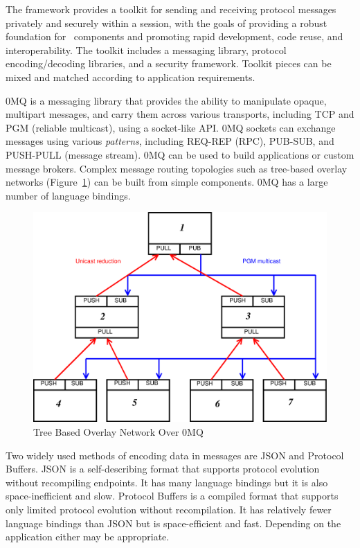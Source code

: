 The framework provides a toolkit for sending and receiving
protocol messages privately and securely within a session,
with the goals of providing a robust foundation for \ngrm\ components
and promoting rapid development, code reuse, and interoperability.
The toolkit includes a messaging library,
protocol encoding/decoding libraries, and a security framework.
Toolkit pieces can be mixed and matched according to application requirements.

0MQ\cite{ZMQGuide} is a messaging library that
provides the ability to manipulate opaque, multipart messages, and
carry them across various transports, including TCP and PGM\cite{rfc3208}
(reliable multicast), using a socket-like API.  0MQ sockets can
exchange messages using various {\em patterns},
including REQ-REP (RPC), PUB-SUB, and PUSH-PULL (message stream).
0MQ can be used to build applications or custom message brokers.
Complex message routing topologies such as tree-based overlay networks
(Figure~\ref{FigZmqTBON}) can be built from simple components.
0MQ has a large number of language bindings.

\begin{figure}
\centering
\includegraphics[scale=0.35]{../fig/zmqtbon.eps}
\caption{Tree Based Overlay Network Over 0MQ}
\label{FigZmqTBON}
\end{figure}

Two widely used methods of encoding data in messages are
JSON\cite{rfc4627} 
and Protocol Buffers\cite{Protobuf}.
JSON is a self-describing format
that supports protocol evolution without recompiling endpoints.  It has
many language bindings but it is also space-inefficient and slow.
Protocol Buffers is a compiled format that supports
only limited protocol evolution without recompilation.  It has relatively
fewer language bindings than JSON but is space-efficient and fast.
Depending on the application either may be appropriate.

